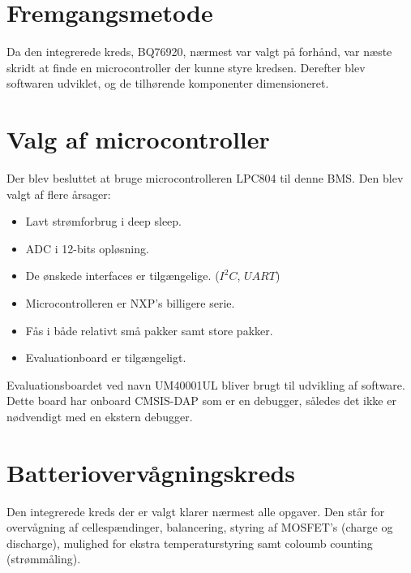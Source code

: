 \section{Fremgangsmetode}

Da den integrerede kreds, BQ76920, nærmest var valgt på forhånd, var næste skridt at finde en microcontroller der kunne styre kredsen. Derefter blev softwaren udviklet, og de tilhørende komponenter dimensioneret. 


\section{Valg af microcontroller}\label{afs:valg_af_uc}
Der blev besluttet at bruge microcontrolleren LPC804 til denne BMS. Den blev valgt af flere årsager:
\begin{itemize}
	\item Lavt strømforbrug i deep sleep.
	\item ADC i 12-bits opløsning.
	\item De ønskede interfaces er tilgængelige. ($I^2C$, $UART$)
	\item Microcontrolleren er NXP's billigere serie. 
	\item Fås i både relativt små pakker samt store pakker.
	\item Evaluationboard er tilgængeligt.
\end{itemize}

Evaluationsboardet ved navn UM40001UL bliver brugt til udvikling af software. Dette board har onboard CMSIS-DAP som er en debugger, således det ikke er nødvendigt med en ekstern debugger. 

\section{Batteriovervågningskreds}
Den integrerede kreds der er valgt klarer nærmest alle opgaver. Den står for overvågning af cellespændinger, balancering, styring af MOSFET's (charge og discharge), mulighed for ekstra temperaturstyring samt coloumb counting (strømmåling). \\


